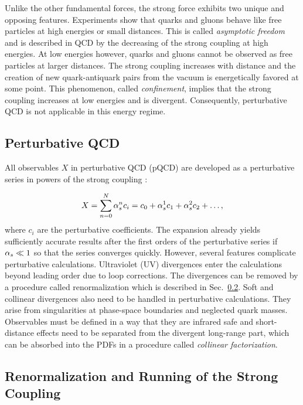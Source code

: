 Unlike the other fundamental forces, the strong force exhibits two unique and
opposing features. Experiments show that quarks and gluons behave like free
particles at high energies or small distances. This is called \emph{asymptotic
freedom} and is described in QCD by the decreasing of the strong coupling at
high energies. At low energies however, quarks and gluons cannot be observed as
free particles at larger distances. The strong coupling increases with distance
and the creation of new quark-antiquark pairs from the vacuum is energetically
favored at some point. This phenomenon, called \emph{confinement}, implies that
the strong coupling increases at low energies and is divergent. Consequently,
perturbative QCD is not applicable in this energy regime.

\subsection{Perturbative QCD}

All observables $X$ in perturbative QCD (pQCD) are developed as a
perturbative series in powers of the strong coupling \as:

\begin{equation*}
    X = \sum_{n=0}^N \alpha_{s}^n c_i = c_0 + \alpha_{s}^1 c_1 + \alpha_{s}^2 c_2 + \ldots, 
\end{equation*}
%
where $c_i$ are the perturbative coefficients. The expansion already yields
sufficiently accurate results after the first orders of the perturbative series
if $\alpha_{s} \ll 1$ so that the series converges quickly. However, several features
complicate perturbative calculations. Ultraviolet (UV) divergences enter the
calculations beyond leading order due to loop corrections. The divergences
can be removed by a procedure called renormalization which is described in
Sec.~\ref{sec:renormalization}. Soft and collinear divergences also need to
be handled in perturbative calculations. They arise from singularities at
phase-space boundaries and neglected quark masses. Observables must be
defined in a way that they are infrared safe and short-distance effects need
to be separated from the divergent long-range part, which can be absorbed
into the PDFs in a procedure called \emph{collinear factorization}.

\subsection{Renormalization and Running of the Strong Coupling}
\label{sec:renormalization}

